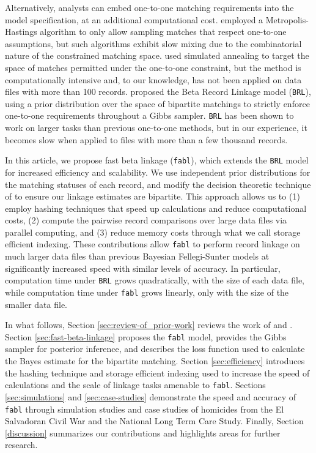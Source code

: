 \documentclass[ba]{imsart}
\begin{document}
Alternatively, analysts can embed one-to-one matching requirements into the model specification, at an additional computational cost. \cite{Larsen05} employed a Metropolis-Hastings algorithm to only allow sampling matches that respect one-to-one assumptions, but such algorithms exhibit slow mixing due to the combinatorial nature of the constrained matching space. \cite{fortunato_2010} used simulated annealing to target the space of matches permitted under the one-to-one constraint, but the method is computationally intensive and, to our knowledge, has not been applied on data files with more than 100 records. \cite{sadinle_bayesian_2017} proposed the Beta Record Linkage model (\texttt{BRL}), using a prior distribution over the space of bipartite matchings to strictly enforce one-to-one requirements throughout a Gibbs sampler. \texttt{BRL} has been shown to work on larger tasks than previous one-to-one methods, but in our experience, it becomes slow when applied to files with more than a few thousand records. 


In this article, we propose fast beta linkage (\texttt{fabl}), which extends the \texttt{BRL} model for increased efficiency and scalability. We use independent prior distributions for the matching statuses of each record, and modify the decision theoretic technique of \cite{sadinle_bayesian_2017} to ensure our linkage estimates are bipartite. This approach allows us to (1) employ hashing techniques that speed up calculations and reduce computational costs, (2) compute the pairwise record comparisons over large data files via parallel computing, and (3) reduce memory costs through what we call storage efficient indexing. These contributions allow \texttt{fabl} to perform record linkage on much larger data files than previous Bayesian Fellegi-Sunter models at significantly increased speed with similar levels of accuracy. In particular, computation time under \texttt{BRL} grows quadratically, with the size of each data file, while computation time under \texttt{fabl} grows linearly, only with the size of the smaller data file.

In what follows, Section \ref{sec:review-of_prior-work} reviews the work of \cite{fellegi_theory_1969} and \cite{sadinle_bayesian_2017}. Section \ref{sec:fast-beta-linkage} proposes the \texttt{fabl} model, provides the Gibbs sampler for posterior inference, and describes the loss function used to calculate the Bayes estimate for the bipartite matching. Section \ref{sec:efficiency} introduces the hashing technique and storage efficient indexing used to increase the speed of calculations and the scale of linkage tasks amenable to \texttt{fabl}. Sections \ref{sec:simulations} and \ref{sec:case-studies} demonstrate the speed and accuracy of \texttt{fabl} through simulation studies and case studies of homicides from the El Salvadoran Civil War and the National Long Term Care Study. Finally, Section \ref{discussion} summarizes our contributions and highlights areas for further research.
\end{document}
